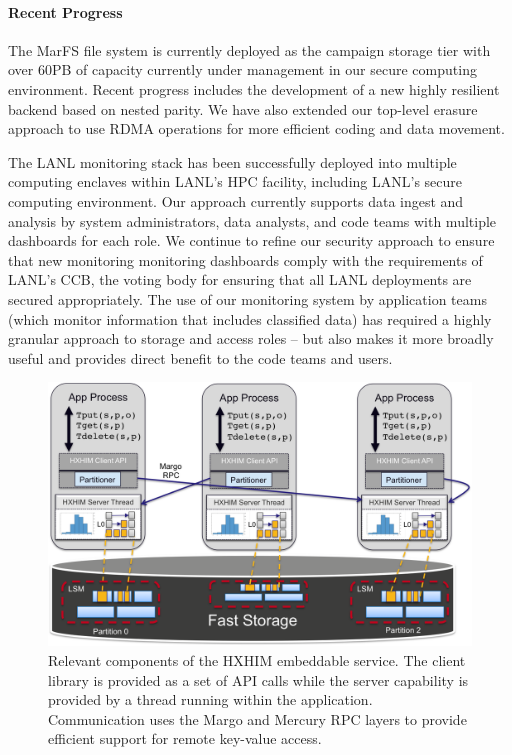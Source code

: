 \paragraph{Recent Progress}
The MarFS file system is currently deployed as the campaign storage tier
with over 60PB of capacity currently under management in our secure computing
environment. Recent progress includes the development of a new highly
resilient backend based on nested parity. We have also extended our top-level
erasure approach to use RDMA operations for more efficient coding and data movement.

The LANL monitoring stack has been successfully deployed into multiple
computing enclaves within LANL's HPC facility, including LANL's secure
computing environment. Our approach currently supports data ingest and
analysis by system administrators, data analysts, and code teams with multiple
dashboards for each role. We continue to refine our security approach to
ensure that new monitoring monitoring dashboards comply with the requirements
of LANL's CCB, the voting body for ensuring that all LANL deployments are
secured appropriately. The use of our monitoring system by application teams
(which monitor information that includes classified data) has required a
highly granular approach to storage and access roles -- but also makes it more
broadly useful and provides direct benefit to the code teams and users.

\begin{figure}[htb]
	\centering
	\includegraphics[width=6in]{projects/2.3.6-NNSA/2.3.6.01-LANL-ATDM/hxhim-main}
	\caption{\label{fig:hxhim} Relevant components of the HXHIM
	embeddable service. The client library is provided as a set of API
	calls while the server capability is provided by a thread running
	within the application. Communication uses the Margo and Mercury RPC
	layers to provide efficient support for remote key-value access.}
\end{figure}


